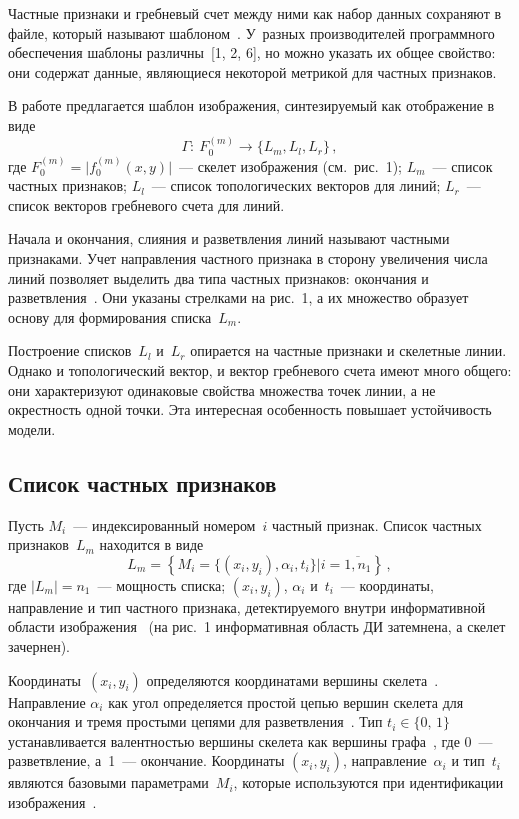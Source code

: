 \begin{multicols}{2}
Частные признаки и гребневый счет между ними как набор данных сохраняют в файле, который
называют шаблоном~\cite{5gud}. У~разных производителей программного обеспечения шаблоны
различны~[1, 2, 6], но можно указать их общее свойство: они содержат данные,
являющиеся некоторой мет\-ри\-кой для частных признаков.

В работе предлагается шаблон изображения, синтезируемый как отображение в виде
\begin{equation*}
\Gamma:\ F_0^{(m)} \rightarrow \{ L_m, L_l, L_r\}\,,
\end{equation*}
где $F_0^{(m)} =\vert f_0^{(m)} (x,y)\vert$~--- скелет изображения (см.\ рис.~1);
$L_m$~--- список частных признаков; $L_l$~--- список топологических векторов для линий;
$L_r$~--- список векторов гребневого счета для линий.

Начала и окончания, слияния и разветвления линий называют частными признаками. Учет
направления частного признака в сторону увеличения числа линий позволяет выделить два типа
частных признаков: окончания и разветвления~\cite{5gud}. Они указаны стрелками на
рис.~1, а их множество образует основу для формирования списка~$L_m$.

Построение списков~$L_l$ и~$L_r$ опирается на частные признаки и скелетные линии. Однако и
топологический вектор, и вектор гребневого счета имеют много общего: они характеризуют
одинаковые свойства множества точек линии, а не окрестность одной точки. Эта интересная
особенность повышает устойчивость модели.

\subsection{Список частных признаков}

Пусть $M_i$~--- индексированный номером~$i$ частный признак. Список частных
признаков~$L_m$ находится в виде
\begin{equation}
L_m =\left \{ M_i=\{(x_i,y_i),\alpha_i,t_i\}\vert i=\overline{1,n_1}\right \}\,,
\label{e2gud}
\end{equation}
где $\vert L_m\vert =n_1$~--- мощность списка; $(x_i, y_i)$, $\alpha_i$ и~$t_i$~--- координаты,
направление и тип частного признака, детектируемого внутри информативной об\-ласти
изображения~\cite{3gud, 4gud} (на рис.~1 информативная область ДИ затемнена, а
скелет зачернен).

Координаты~$(x_i,y_i)$ определяются координатами вершины скелета~\cite{1gud}. Направление
$\alpha_i$ как угол определяется простой цепью вершин скелета для\linebreak
окончания и тремя
простыми цепями для раз\-ветвления~\cite{5gud, 2gud}. Тип $t_i\in \{0,\,1\}$ устанавливается
валентностью вершины скелета как вершины графа~\cite{2gud}, где 0~--- разветвление, а~1~---
 окончание. Координаты
  $(x_i,y_i)$, направление~$\alpha_i$ и тип~$t_i$ являются базовыми
параметрами~$M_i$, которые используются при идентификации изображения~\cite{6gud, 5gud}.


\end{multicols}
